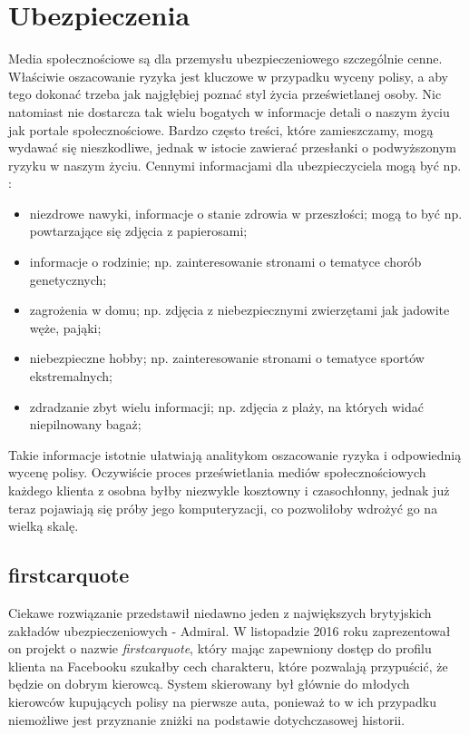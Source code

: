 \documentclass[polish]{kbk}
\begin{document}
\section{Ubezpieczenia}
Media społecznościowe są dla przemysłu ubezpieczeniowego szczególnie cenne. Właściwie oszacowanie ryzyka jest kluczowe w przypadku wyceny polisy, a aby tego dokonać trzeba jak najgłębiej poznać styl życia prześwietlanej osoby. Nic natomiast nie dostarcza tak wielu bogatych w informacje detali o naszym życiu jak portale społecznościowe. Bardzo często treści, które zamieszczamy, mogą wydawać się nieszkodliwe, jednak w istocie zawierać przesłanki o podwyższonym ryzyku w naszym życiu. Cennymi informacjami dla ubezpieczyciela mogą być np. \cite{insurance-quotes}:
\begin{itemize}
\item niezdrowe nawyki, informacje o stanie zdrowia w przeszłości; mogą to być np. powtarzające się zdjęcia z papierosami;
\item informacje o rodzinie; np. zainteresowanie stronami o tematyce chorób genetycznych;
\item zagrożenia w domu; np. zdjęcia z niebezpiecznymi zwierzętami jak jadowite węże, pająki;
\item niebezpieczne hobby; np. zainteresowanie stronami o tematyce sportów ekstremalnych;
\item zdradzanie zbyt wielu informacji; np. zdjęcia z plaży, na których widać niepilnowany bagaż;
\end{itemize}
Takie informacje istotnie ułatwiają analitykom oszacowanie ryzyka i odpowiednią wycenę polisy. Oczywiście proces prześwietlania mediów społecznościowych każdego klienta z osobna byłby niezwykle kosztowny i czasochłonny, jednak już teraz pojawiają się próby jego komputeryzacji, co pozwoliłoby wdrożyć go na wielką skalę.

\subsection{firstcarquote \cite{guardian, guardian-stop}}
Ciekawe rozwiązanie przedstawił niedawno jeden z największych brytyjskich zakładów ubezpieczeniowych - Admiral. W listopadzie 2016 roku zaprezentował on projekt o nazwie \textit{firstcarquote}, który mając zapewniony dostęp do profilu klienta na Facebooku szukałby cech charakteru, które pozwalają przypuścić, że będzie on dobrym kierowcą. System skierowany był głównie do młodych kierowców kupujących polisy na pierwsze auta, ponieważ to w ich przypadku niemożliwe jest przyznanie zniżki na podstawie dotychczasowej historii. 
\end{document}
